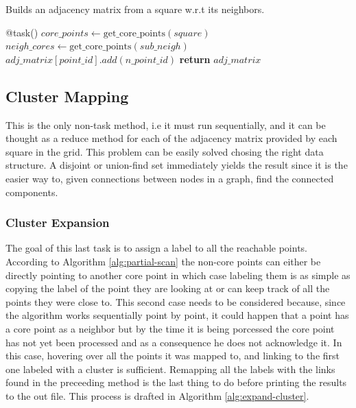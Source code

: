 \documentclass[10pt,journal,compsoc]{IEEEtran}
\let\MYoriglatexcaption\caption
\renewcommand{\caption}[2][\relax]{\MYoriglatexcaption[#2]{#2}}
\begin{document}
\begin{algorithm}
  \caption{Builds an adjacency matrix from a square w.r.t its neighbors.\label{alg:sync-clusters}}
  \begin{algorithmic}[1]
    \State @task()
        \State $core\_points \gets \text{get\_core\_points}(square)$
            \State $neigh\_cores \gets \text{get\_core\_points}(sub\_neigh)$
                \State $adj\_matrix[point\_id].add(n\_point\_id)$
            \EndIf
        \EndFor
        \State \textbf{return} $adj\_matrix$
    \EndFunction
  \end{algorithmic}
\end{algorithm}

\subsection{Cluster Mapping} \label{subsec:cluster-mapping}
This is the only non-task method, i.e it must run sequentially, and it can be thought as a reduce method for each of the adjacency matrix provided by each square in the grid. This problem can be easily solved chosing the right data structure. A disjoint or union-find set immediately yields the result since it is the easier way to, given connections between nodes in a graph, find the connected components.

\subsubsection{Cluster Expansion} \label{cluster_exp}
The goal of this last task is to assign a label to all the reachable points. According to Algorithm \ref{alg:partial-scan} the non-core points can either be directly pointing to another core point in which case labeling them is as simple as copying the label of the point they are looking at  or can keep track of all the points they were close to. This second case needs to be considered because, since the algorithm works sequentially point by point, it could happen that a point has a core point as a neighbor but by the time it is being porcessed the core point has not yet been processed and as a consequence he does not acknowledge it. In this case, hovering over all the points it was mapped to, and linking to the first one labeled with a cluster is sufficient. Remapping all the labels with the links found in the preceeding method is the last thing to do before printing the results to the out file. This process is drafted in Algorithm \ref{alg:expand-cluster}.
\end{document}
